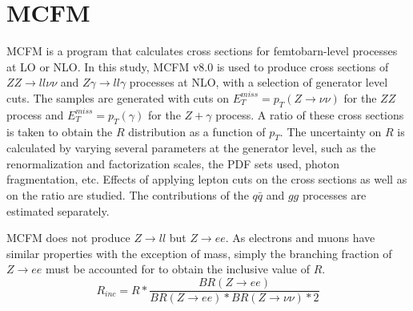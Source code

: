 \documentclass[11pt,a4paper]{report}
\newcommand{\ZZ}{$ZZ\to ll\nu\nu$ }
\newcommand{\Zg}{$Z\gamma\to ll\gamma$ }
\begin{document}
\section{MCFM}
MCFM is a program that calculates cross sections for femtobarn-level processes at LO or NLO. In this study, MCFM v8.0 \cite{MCFM} is used to produce cross sections of \ZZ and \Zg processes at NLO, with a selection of generator level cuts. The samples are generated with cuts on $E_T^{miss} = p_T(Z\to \nu\nu)$ for the $ZZ$ process and $E_T^{miss} = p_T(\gamma)$ for the $Z+\gamma$ process. A ratio of these cross sections is taken to obtain the $R$ distribution as a function of $p_T$. The uncertainty on $R$ is calculated by varying several parameters at the generator level, such as the renormalization and factorization scales, the PDF sets used, photon fragmentation, etc. Effects of applying lepton cuts on the cross sections as well as on the ratio are studied. The contributions of the $q \bar{q}$ and $gg$ processes are estimated separately.

MCFM does not produce $Z\rightarrow ll$ but $Z\rightarrow ee$. As electrons and muons have similar properties with the exception of mass, simply the branching fraction of $Z\rightarrow ee$ must be accounted for to obtain the inclusive value of $R$.
\begin{equation}\label{eq:R_inc}
	R_{inc} = R * \frac{BR(Z\rightarrow ee)}{BR(Z \rightarrow ee)*BR(Z\rightarrow \nu\nu)*2}
\end{equation}
\end{document}
